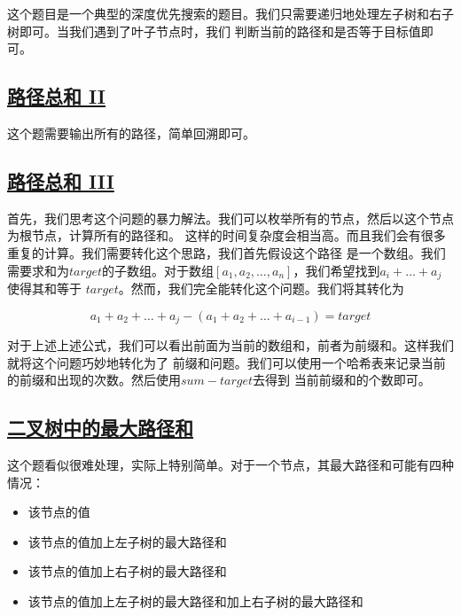 \documentclass[../../main.tex]{subfiles}
\begin{document}
这个题目是一个典型的深度优先搜索的题目。我们只需要递归地处理左子树和右子树即可。当我们遇到了叶子节点时，我们
判断当前的路径和是否等于目标值即可。



\subsection{\href{https://leetcode-cn.com/problems/path-sum-ii/}{路径总和 II}}

这个题需要输出所有的路径，简单回溯即可。



\subsection{\href{https://leetcode-cn.com/problems/path-sum-iii/}{路径总和 III}}

首先，我们思考这个问题的暴力解法。我们可以枚举所有的节点，然后以这个节点为根节点，计算所有的路径和。
这样的时间复杂度会相当高。而且我们会有很多重复的计算。我们需要转化这个思路，我们首先假设这个路径
是一个数组。我们需要求和为$target$的子数组。对于数组$[a_{1}, a_{2}, \dots, a_{n}]$，我们希望找到$a_{i} + \dots + a_{j}$使得其和等于
$target$。然而，我们完全能转化这个问题。我们将其转化为

$$
a_{1} + a_{2} + \dots +a_{j} - (a_{1} + a_{2} + \dots + a_{i - 1}) = target
$$

对于上述上述公式，我们可以看出前面为当前的数组和，前者为前缀和。这样我们就将这个问题巧妙地转化为了
前缀和问题。我们可以使用一个哈希表来记录当前的前缀和出现的次数。然后使用$sum - target$去得到
当前前缀和的个数即可。



\subsection{\href{https://leetcode.cn/problems/binary-tree-maximum-path-sum/}
{二叉树中的最大路径和}}

这个题看似很难处理，实际上特别简单。对于一个节点，其最大路径和可能有四种情况：

\begin{itemize}
  \item 该节点的值
  \item 该节点的值加上左子树的最大路径和
  \item 该节点的值加上右子树的最大路径和
  \item 该节点的值加上左子树的最大路径和加上右子树的最大路径和
\end{itemize}
\end{document}
